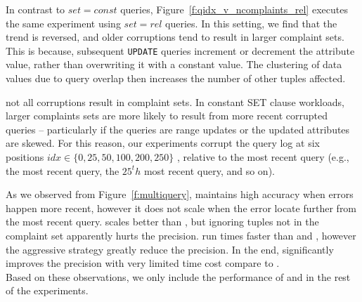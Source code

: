 In contrast to $set=const$ queries, Figure~\ref{f:qidx_v_ncomplaints_rel} executes the 
same experiment using $set=rel$ queries.  In this setting, we find that the trend is
reversed, and older corruptions tend to result in larger complaint sets.  This is because,
subsequent \texttt{UPDATE} queries increment or decrement the attribute value, rather than
overwriting it with a constant value.  The clustering of data values due to query overlap
then increases the number of other tuples affected.


not all corruptions result in complaint sets.
In constant SET clause workloads, larger complaints sets are more likely to
result from more recent corrupted queries -- particularly if the queries are range updates or
the updated attributes are skewed.
For this reason, our experiments corrupt the query log at six positions 
$idx \in \{0, 25, 50, 100, 200, 250\}$ , relative 
to the most recent query (e.g., the most recent query, the $25^th$ most recent query, and so on).



As we observed from Figure~\ref{f:multiquery}, \milpall maintains high accuracy when errors
happen more recent, however it does not scale when the error locate further from the most
recent query. \milptuple scales better than \milpall, but ignoring tuples not 
in the complaint set apparently hurts the precision. \milptuplestopearly run times faster
than \milpall and \milptuple, however the aggressive strategy greatly reduce the 
precision. In the end, \milpadvtuple significantly improves the precision with very limited
time cost compare to \milptuple. \\
Based on these observations, we only include the performance of \milpadvtuple and \milpadvall
in the rest of the experiments. 

